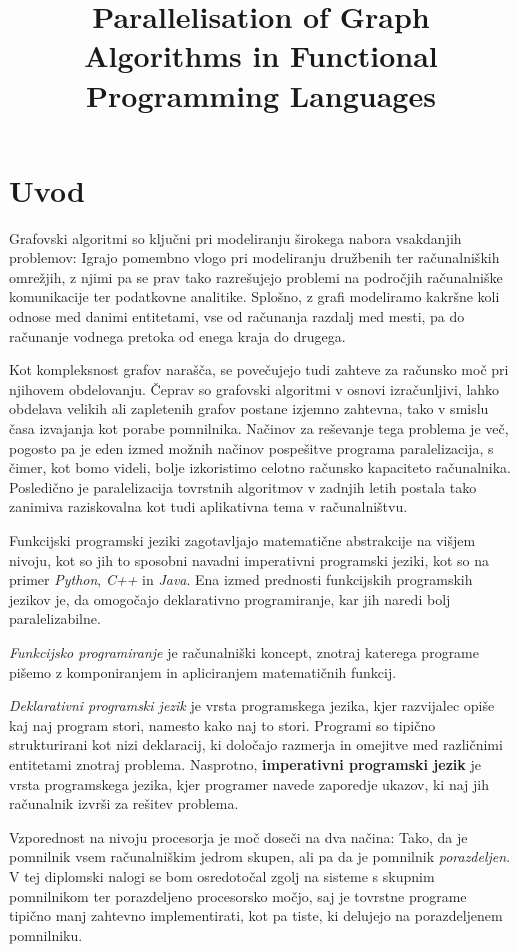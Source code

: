 \documentclass[mat1, tisk]{fmfdelo}
\title{Parallelisation of Graph Algorithms in Functional Programming Languages}
\begin{document}
\section{Uvod}

Grafovski algoritmi so ključni pri modeliranju širokega nabora vsakdanjih problemov: 
Igrajo pomembno vlogo pri modeliranju družbenih ter računalniških omrežjih, z njimi pa se prav tako razrešujejo 
problemi na področjih računalniške komunikacije ter podatkovne analitike. Splošno, z grafi  modeliramo kakršne 
koli odnose med danimi entitetami, vse od računanja razdalj med mesti, pa do računanje vodnega pretoka 
od enega kraja do drugega.

Kot kompleksnost grafov narašča, se povečujejo tudi zahteve za računsko moč pri njihovem obdelovanju. 
Čeprav so grafovski algoritmi v osnovi izračunljivi, lahko obdelava velikih ali zapletenih grafov postane izjemno
zahtevna, tako v smislu časa izvajanja kot porabe pomnilnika. Načinov za reševanje tega problema je več, pogosto pa
je eden izmed možnih načinov pospešitve programa paralelizacija, s čimer, kot bomo videli, bolje izkoristimo celotno
računsko kapaciteto računalnika. Posledično je paralelizacija tovrstnih algoritmov v zadnjih letih postala tako
zanimiva raziskovalna kot tudi aplikativna tema v računalništvu.

Funkcijski programski jeziki zagotavljajo matematične abstrakcije na višjem nivoju, kot so jih to sposobni navadni
imperativni programski jeziki, kot so na primer \textit{Python}, \textit{C++} in \textit{Java}. 
Ena izmed prednosti funkcijskih programskih jezikov je, da omogočajo deklarativno programiranje, 
kar jih naredi bolj paralelizabilne.

\emph{Funkcijsko programiranje} je računalniški koncept, znotraj katerega programe
pišemo z komponiranjem in apliciranjem matematičnih funkcij. 

\emph{Deklarativni programski jezik} je vrsta programskega jezika, kjer razvijalec opiše kaj naj program stori, 
namesto kako naj to stori. Programi so tipično strukturirani kot nizi deklaracij, ki določajo razmerja in omejitve
med različnimi entitetami znotraj problema. 
Nasprotno, \textbf{imperativni programski jezik} je vrsta programskega jezika, kjer programer navede zaporedje ukazov,
ki naj jih računalnik izvrši za rešitev problema.

Vzporednost na nivoju procesorja je moč doseči na dva načina: 
Tako, da je pomnilnik vsem računalniškim jedrom skupen, ali pa da je pomnilnik \textit{porazdeljen}. 
V tej diplomski nalogi se bom osredotočal zgolj na sisteme s skupnim pomnilnikom ter porazdeljeno procesorsko močjo, 
saj je tovrstne programe tipično manj zahtevno implementirati, kot pa tiste, ki delujejo na porazdeljenem pomnilniku.
\end{document}
